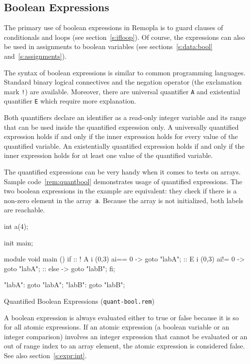 \documentclass[a4paper,11pt,titlepage,english]{article}
\begin{document}
\subsection{Boolean Expressions\label{s:expr:bool}}

The primary use of boolean expressions in Remopla is to guard clauses of
conditionals and loops (see section~\ref{s:ifloop}). Of course, the
expressions can also be used in assignments to boolean variables (see
sections~\ref{s:data:bool} and~\ref{s:assignments}). 

The syntax of boolean expressions is similar to common programming
languages. Standard binary logical connectives and the negation operator
(the exclamation mark \verb|!|) are available. Moreover, there are
universal quantifier \verb|A| and existential quantifier \verb|E| which
require more explanation.

Both quantifiers declare an identifier as a read-only integer variable and
its range that can be used inside the quantified expression only.  A universally
quantified expression holds if and only if the inner expression holds for
every value of the quantified variable. An existentially quantified
expression holds if and only if the inner expression holds for at least one
value of the quantified variable.

The quantified expressions can be very handy when it comes to tests on
arrays. Sample code~\ref{rem:quantbool} demonstrates usage of quantified
expressions. The two boolean expressions in the example are equivalent:
they check if there is a non-zero element in the array~\verb|a|. Because the
array is not initialized, both labels are reachable.

\begin{SampleCode}
\begin{RemoplaCode}
    int a\rbrk(4);

    init main;

    module void main () {
        if
        :: ! A i (0,3) a\lbrk[]i\rbrk == 0 -> goto "labA";
        ::   E i (0,3) a\lbrk[]i\rbrk != 0 -> goto "labA";
        :: else  -> goto "labB";
        fi;
    }

    "labA": goto "labA";
    "labB": goto "labB";
\end{RemoplaCode}
\caption{Quantified Boolean Expressions
(\texttt{quant-bool.rem})\label{rem:quantbool}}
\end{SampleCode}

A boolean expression is always evaluated either to true or false because
it is so for all atomic expressions. If an atomic expression (a boolean
variable or an integer comparison) involves an integer expression that
cannot be evaluated or an out of range index to an array element, the
atomic expression is considered false. See also section~\ref{s:expr:int}.
\end{document}
